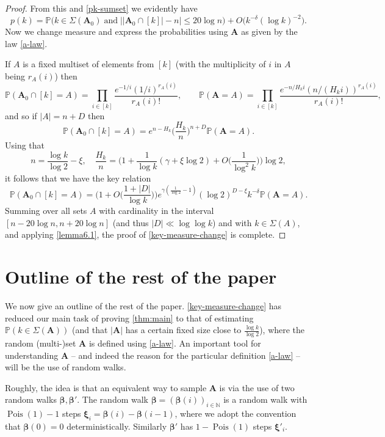 \documentclass[11pt,reqno]{amsart}
\numberwithin{equation}{section}
\theoremstyle{definition}
\theoremstyle{remark}
\newcommand{\mb}{\mathbb}
\newcommand{\mbf}{\mathbf}
\newcommand\Pois{\operatorname{Pois}}
\def\boldbeta{\boldsymbol\beta}
\def\boldxi{\boldsymbol\xi}
\renewcommand{\le}{\leqslant}
\newcommand\N{\mathbb{N}}
\begin{document}
\begin{proof}
From this and \cref{pk-sumset} we evidently have
\[
p(k) = \mb{P}\big(k \in \Sigma(\mbf{A}_0) \; \mbox{and} \; \big| |\mbf{A}_0 \cap [k]| - n\big| \le 20 \log n \big) + O\big( k^{-\delta} (\log k)^{-2}\big).
\]
Now we change measure and express the probabilities using $\mbf{A}$ as given by the law \cref{a-law}.

If $A$ is a fixed multiset of elements from $[k]$ (with the multiplicity of $i$ in $A$ being $r_A(i)$) then 
\[ \mb{P}(\mbf{A}_0 \cap [k] = A) = \prod_{i \in [k]} \frac{e^{-1/i} (1/i)^{r_A(i)}}{r_A(i)!}, \qquad \mb{P}(\mbf{A} = A) =  \prod_{i \in [k]} \frac{e^{-n/H_k i} (n/(H_k i))^{r_A(i)}}{r_A(i)!} ,\] and so if $|A| = n + D$ then 
\[ \mb{P}(\mbf{A}_0 \cap [k]= A) =  e^{n - H_k} \big(\frac{H_k}{n}\big)^{n + D}\mb{P}(\mbf{A} = A).\]
Using that 
\[ n = \frac{\log k}{\log 2} - \xi, \quad \frac{H_k}{n} =  \Big( 1 + \frac{1}{\log k} (\gamma + \xi \log 2) + O\big(\frac{1}{\log^2 k}\big) \Big) \log 2,\]
it follows that we have the key relation \[ \mb{P}(\mbf{A}_0 \cap [k] = A) = \Big(1 + O\big(\frac{1 + |D|}{\log k}\big) \Big) e^{\gamma(\frac{1}{\log 2} - 1)} (\log 2)^{D - \xi} k^{-\delta} \mb{P}(\mbf{A} = A).\] 
Summing over all sets $A$ with cardinality in the interval $[n - 20\log n, n + 20\log n]$ (and thus $|D| \ll \log \log k$) and with $k \in \Sigma(A)$, and applying \cref{lemma6.1}, the proof of \cref{key-measure-change} is complete.
\end{proof}

\section{Outline of the rest of the paper}\label{outline-sec4}

We now give an outline of the rest of the paper. \cref{key-measure-change} has reduced our main task of proving \cref{thm:main} to that of estimating $\mb{P}(k \in \Sigma(\mbf{A}))$ (and that $|\mbf{A}|$ has a certain fixed size close to $\frac{\log k}{\log 2}$), where the random (multi-)set $\mbf{A}$ is defined using \cref{a-law}. An important tool for understanding $\mbf{A}$ -- and indeed the reason for the particular definition \cref{a-law} -- will be the use of random walks.

Roughly, the idea is that an equivalent way to sample $\mbf{A}$ is via the use of two random walks $\boldbeta, \boldbeta'$. The random walk $\boldbeta = (\boldbeta(i))_{i \in \N}$ is a random walk with $\Pois(1) - 1$ steps $\boldxi_i = \boldbeta(i) - \boldbeta(i-1)$, where we adopt the convention that $\boldbeta(0) = 0$ deterministically. Similarly $\boldbeta'$ has $1 - \Pois(1)$ steps $\boldxi'_i$. 
\end{document}
